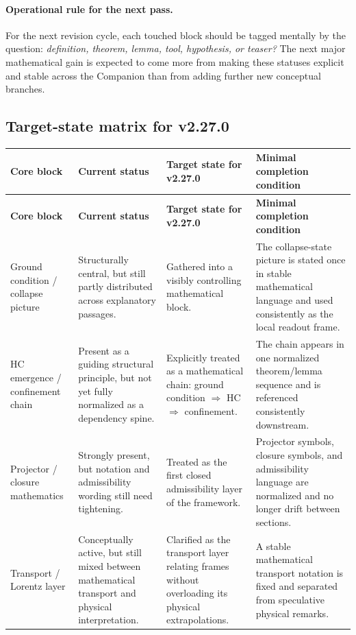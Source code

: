 \paragraph{Operational rule for the next pass.}
For the next revision cycle, each touched block should be tagged mentally by the question: \emph{definition, theorem, lemma, tool, hypothesis, or teaser?} The next major mathematical gain is expected to come more from making these statuses explicit and stable across the Companion than from adding further new conceptual branches.


\subsection*{Target-state matrix for v2.27.0}

\small\begin{longtable}{p{}p{}p{}p{}}
\toprule
\textbf{Core block} & \textbf{Current status} & \textbf{Target state for v2.27.0} & \textbf{Minimal completion condition} \\
\midrule
\endfirsthead
\toprule
\textbf{Core block} & \textbf{Current status} & \textbf{Target state for v2.27.0} & \textbf{Minimal completion condition} \\
\midrule
\endhead
Ground condition / collapse picture & Structurally central, but still partly distributed across explanatory passages. & Gathered into a visibly controlling mathematical block. & The collapse-state picture is stated once in stable mathematical language and used consistently as the local readout frame. \\

HC emergence / confinement chain & Present as a guiding structural principle, but not yet fully normalized as a dependency spine. & Explicitly treated as a mathematical chain: ground condition $\Rightarrow$ HC $\Rightarrow$ confinement. & The chain appears in one normalized theorem/lemma sequence and is referenced consistently downstream. \\

Projector / closure mathematics & Strongly present, but notation and admissibility wording still need tightening. & Treated as the first closed admissibility layer of the framework. & Projector symbols, closure symbols, and admissibility language are normalized and no longer drift between sections. \\

Transport / Lorentz layer & Conceptually active, but still mixed between mathematical transport and physical interpretation. & Clarified as the transport layer relating frames without overloading its physical extrapolations. & A stable mathematical transport notation is fixed and separated from speculative physical remarks. \\


\end{longtable}

